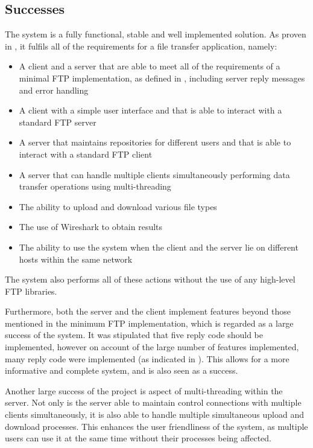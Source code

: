 \documentclass[10pt,twocolumn]{witseiepaper}
\begin{document}
\subsection{Successes}
The system is a fully functional, stable and well implemented solution. As proven in , it fulfils all of the requirements for a file transfer application, namely:
\begin{itemize}
	\item A client and a server that are able to meet all of the requirements of a minimal FTP implementation, as defined in \cite{rfc}, including server reply messages and error handling
	\item A client with a simple user interface and that is able to interact with a standard FTP server
	\item A server that maintains repositories for different users and that is able to interact with a standard FTP client
	\item A server that can handle multiple clients simultaneously performing data transfer operations using multi-threading
	\item The ability to upload and download various file types
	\item The use of Wireshark to obtain results
	\item The ability to use the system when the client and the server lie on different hosts within the same network
	
\end{itemize}

The system also performs all of these actions without the use of any high-level FTP libraries. 

Furthermore, both the server and the client implement features beyond those mentioned in the minimum FTP implementation, which is regarded as a large success of the system. It was stipulated that five reply code should be implemented, however on account of the large number of features implemented, many reply code were implemented (as indicated in ). This allows for a more informative and complete system, and is also seen as a success.

Another large success of the project is aspect of multi-threading within the server. Not only is the server able to maintain control connections with multiple clients simultaneously, it is also able to handle multiple simultaneous upload and download processes. This enhances the user friendliness of the system, as multiple users can use it at the same time without their processes being affected.
\end{document}
